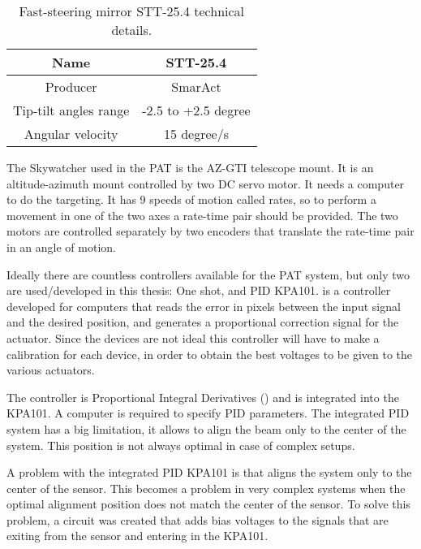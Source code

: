 \begin{table}[h!]
      \centering
      \begin{tabular}{ |c|c| }
            \hline
            Name                  & STT-25.4            \\\hline
            Producer              & SmarAct             \\\hline
            Tip-tilt angles range & -2.5 to +2.5 degree \\\hline
            Angular velocity      & 15 degree/s         \\\hline
      \end{tabular}
      \caption{Fast-steering mirror STT-25.4 technical details.}
      \label{table:3}
\end{table}

The Skywatcher used in the PAT is the AZ-GTI telescope mount. It is an altitude-azimuth mount controlled by two DC servo motor. It needs a computer to do the targeting.
It has 9 speeds of motion called rates, so to perform a movement in one of the two axes a rate-time pair should be provided. The two motors are controlled separately by two encoders that translate the rate-time pair in an angle of motion.

Ideally there are countless controllers available for the PAT system, but only two are used/developed in this thesis: One shot, and PID KPA101.
 is a controller developed for computers that reads the error in pixels between the input signal and the desired position, and generates a proportional correction signal for the actuator.
Since the devices are not ideal this controller will have to make a calibration for each device, in order to obtain the best voltages to be given to the various actuators.

The  controller is Proportional Integral Derivatives () and is integrated into the KPA101. A computer is required to specify PID parameters. The integrated PID system has a big limitation, it allows to align the beam only to the center of the system. This position is not always optimal in case of complex setups.

A problem with the integrated PID KPA101 is that aligns the system only to the center of the sensor. This becomes a problem in very complex systems when the optimal alignment position does not match the center of the sensor.
To solve this problem, a circuit was created that adds bias voltages to the signals that are exiting from the sensor and entering in the KPA101.

